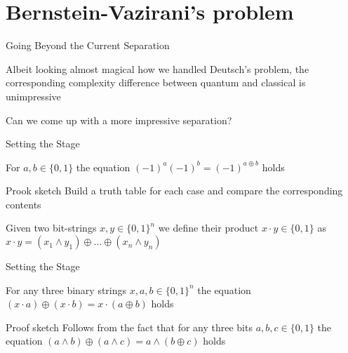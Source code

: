 \documentclass{beamer}
\begin{document}
\section{Bernstein-Vazirani's problem}

\begin{frame}{Going Beyond the Current Separation}

        Albeit looking almost magical how we handled Deutsch's problem, the
        corresponding complexity difference between quantum and classical is
        \alert{unimpressive}
        
        Can we come up with a more impressive separation?
\end{frame}

\begin{frame}{Setting the Stage}
        \begin{lemma}
                For $a,b \in \{0,1\}$ the equation $(-1)^a(-1)^b = (-1)^{a \oplus b}$
                holds
        \end{lemma}
        \begin{block}{Prook sketch}
                Build a truth table for each case and compare the corresponding
                contents
        \end{block}

        \vfill
        \begin{definition}
                Given two bit-strings $x,y \in \{0,1\}^n$ we define
                their product $x \cdot y \in \{0,1\}$ as
                        $x \cdot y = (x_1 \wedge y_1) \oplus \dots
                        \oplus (x_n \wedge y_n)$
        \end{definition}
\end{frame}

\begin{frame}{Setting the Stage}

        \begin{lemma}
                For any three binary strings $x,a,b \in \{0,1\}^n$ the equation
                $(x \cdot a) \oplus (x \cdot b) = x \cdot (a \oplus b)$ holds
        \end{lemma}

        \begin{block}{Proof sketch} 
                Follows from the fact that for any three bits $a,b,c \in
                \{0,1\}$ the equation $(a \wedge b) \oplus (a \wedge c) = a
                \wedge (b \oplus c)$ holds
        \end{block}
\end{frame}
\end{document}
